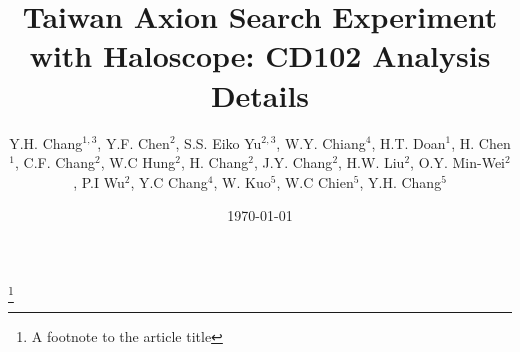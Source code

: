 \documentclass[%
preprint, %
 amsmath,amssymb,
 aps,
]{revtex4-2}
\newcommand{\muevcc}{\ensuremath{\,\mu\text{e\hspace{-.08em}V}}}
\newcommand{\mlo}{\ensuremath{19.4687}}
\newcommand{\mhi}{\ensuremath{19.8436}}
\begin{document}

\title{Taiwan Axion Search Experiment with Haloscope: CD102 Analysis Details}%
\thanks{A footnote to the article title}%


\author{Y.H. Chang$^{1,3}$, Y.F. Chen$^2$, S.S. Eiko Yu$^{2,3}$, W.Y. Chiang$^4$,
  H.T. Doan$^1$, H. Chen$^1$, C.F. Chang$^2$, W.C Hung$^2$, H. Chang$^2$, J.Y. Chang$^2$,
  H.W. Liu$^2$, O.Y. Min-Wei$^2$, P.I Wu$^2$, Y.C Chang$^4$, W. Kuo$^5$, W.C Chien$^5$, Y.H. Chang$^5$}



\date{\today}%
\end{document}
